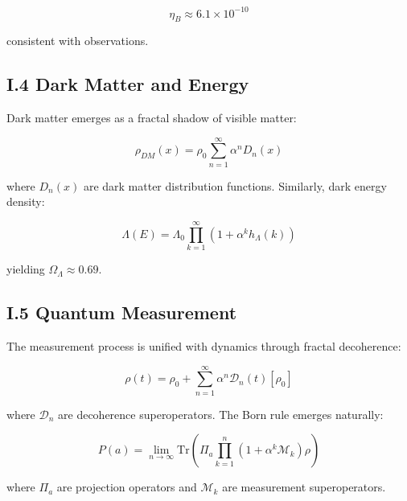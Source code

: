 \[
\eta_B \approx 6.1 \times 10^{-10}
\]

consistent with observations.

\subsection*{I.4 Dark Matter and Energy}
\label{subsec:dark_matter_energy}

Dark matter emerges as a fractal shadow of visible matter:

\[
\rho_{DM}(x) = \rho_0 \sum_{n=1}^{\infty} \alpha^n D_n(x)
\]

where $D_n(x)$ are dark matter distribution functions. Similarly, dark energy density:

\[
\Lambda(E) = \Lambda_0 \prod_{k=1}^{\infty} (1 + \alpha^k h_\Lambda(k))
\]

yielding $\Omega_\Lambda \approx 0.69$.

\subsection*{I.5 Quantum Measurement}
\label{subsec:quantum_measurement}

The measurement process is unified with dynamics through fractal decoherence:

\[
\rho(t) = \rho_0 + \sum_{n=1}^{\infty} \alpha^n \mathcal{D}_n(t)[\rho_0]
\]

where $\mathcal{D}_n$ are decoherence superoperators. The Born rule emerges naturally:

\[
P(a) = \lim_{n \to \infty} \text{Tr}\left(\Pi_a \prod_{k=1}^n (1 + \alpha^k \mathcal{M}_k)\rho\right)
\]

where $\Pi_a$ are projection operators and $\mathcal{M}_k$ are measurement superoperators. 